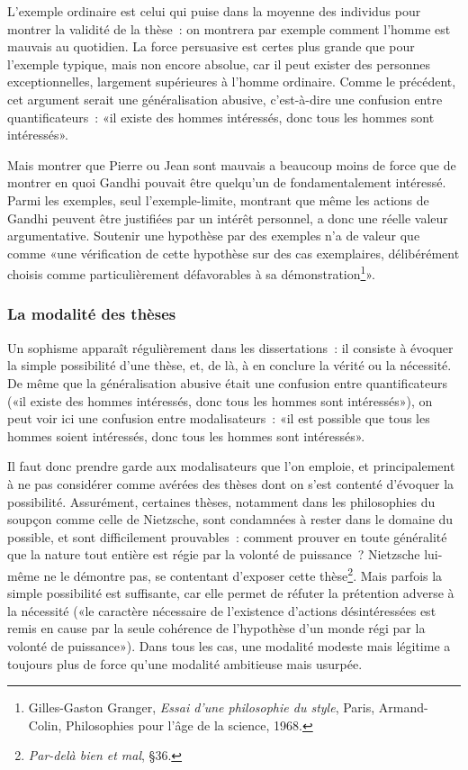 \documentclass[a4paper,11pt]{article}
\newcommand{\cad}{c'est-à-dire}
\begin{document}
\par

L'exemple ordinaire est celui qui puise dans la moyenne des individus
pour montrer la validité de la thèse~: on montrera par exemple comment
l'homme est mauvais au quotidien. La force persuasive est certes plus
grande que pour l'exemple typique, mais non encore absolue, car il peut
exister des personnes exceptionnelles, largement supérieures à l'homme
ordinaire. Comme le précédent, cet argument serait une généralisation
abusive, \cad{} une confusion entre quantificateurs~: «il existe des
hommes intéressés, donc tous les hommes sont intéressés».

\par

Mais montrer que Pierre ou Jean sont mauvais a beaucoup moins de force
que de montrer en quoi Gandhi pouvait être quelqu'un de fondamentalement
intéressé. Parmi les exemples, seul l'exemple-limite, montrant que même
les actions de Gandhi peuvent être justifiées par un intérêt personnel,
a donc une réelle valeur argumentative.  Soutenir une hypothèse par des
exemples n'a de valeur que comme «une vérification de cette hypothèse
sur des cas exemplaires, délibérément choisis comme particulièrement
défavorables à sa démonstration\footnote{Gilles-Gaston Granger,
  \emph{Essai d'une philosophie du style}, Paris, Armand-Colin,
  Philosophies pour l'âge de la science, 1968.}».




\subsubsection{La modalité des thèses}

Un sophisme apparaît régulièrement dans les dissertations~: il consiste
à évoquer la simple possibilité d'une thèse, et, de là, à en conclure la
vérité ou la nécessité. De même que la généralisation abusive était une
confusion entre quantificateurs («il existe des hommes intéressés, donc
tous les hommes sont intéressés»), on peut voir ici une confusion entre
modalisateurs~: «il est possible que tous les hommes soient intéressés,
donc tous les hommes sont intéressés».

\par

Il faut donc prendre garde aux modalisateurs que l'on emploie, et
principalement à ne pas considérer comme avérées des thèses dont on
s'est contenté d'évoquer la possibilité. Assurément, certaines thèses,
notamment dans les philosophies du soupçon comme celle de Nietzsche,
sont condamnées à rester dans le domaine du possible, et sont
difficilement prouvables~: comment prouver en toute généralité que la
nature tout entière est régie par la volonté de puissance~? Nietzsche
lui-même ne le démontre pas, se contentant d'exposer cette
thèse\footnote{\emph{Par-delà bien et mal}, §36.}. Mais parfois la
simple possibilité est suffisante, car elle permet de réfuter la
prétention adverse à la nécessité («le caractère nécessaire de
l'existence d'actions désintéressées est remis en cause par la seule
cohérence de l'hypothèse d'un monde régi par la volonté de
puissance»). Dans tous les cas, une modalité modeste mais légitime a
toujours plus de force qu'une modalité ambitieuse mais usurpée.
\end{document}
